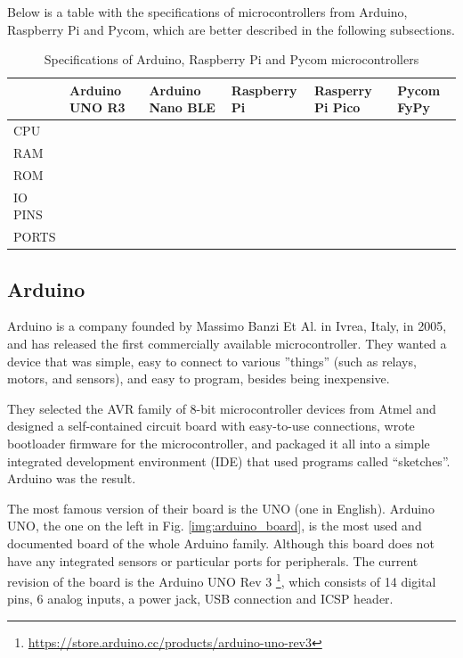 	Below is a table with the specifications of microcontrollers from Arduino, Raspberry Pi and Pycom, which are better described in the following subsections.
	\begin{table}[htbp]
		\begin{center}
			\begin{tabularx}{\textwidth}{@{}|Y|Y|Y|Y|Y|Y|@{}} 
				\hline
				& Arduino UNO R3 & Arduino Nano BLE & Raspberry Pi & Rasperry Pi Pico & Pycom FyPy \\\hline
					CPU &&&&& \\\hline
					RAM &&&&& \\\hline
					ROM &&&&& \\\hline
					IO PINS &&&&& \\\hline
					PORTS &&&&& \\\hline
			\end{tabularx}
			\caption{Specifications of Arduino, Raspberry Pi and Pycom microcontrollers}
			\label{table:1}
		\end{center}
	\end{table}

	\subsection{Arduino}\label{subsec:arduino}
	
		Arduino is a company founded by Massimo Banzi Et Al. in Ivrea, Italy, in 2005, and has released the first commercially available microcontroller.
		They wanted a device that was simple, easy to connect to various ''things'' (such as relays, motors, and sensors), and easy to program, besides being inexpensive.
	
		They selected the AVR family of 8-bit microcontroller devices from Atmel and designed a self-contained circuit board with easy-to-use connections, wrote bootloader firmware for the microcontroller, and packaged it all into a simple integrated development environment (IDE) that used programs called “sketches”. 
		Arduino was the result.
		
		The most famous version of their board is the UNO (one in English).
		Arduino UNO, the one on the left in Fig. \ref{img:arduino_board}, is the most used and documented board of the whole Arduino family.
		Although this board does not have any integrated sensors or particular ports for peripherals.
		The current revision of the board is the Arduino UNO Rev 3 \footnote{\url{https://store.arduino.cc/products/arduino-uno-rev3}}, which consists of 14 digital pins, 6 analog inputs, a power jack, USB connection and ICSP header.
		
